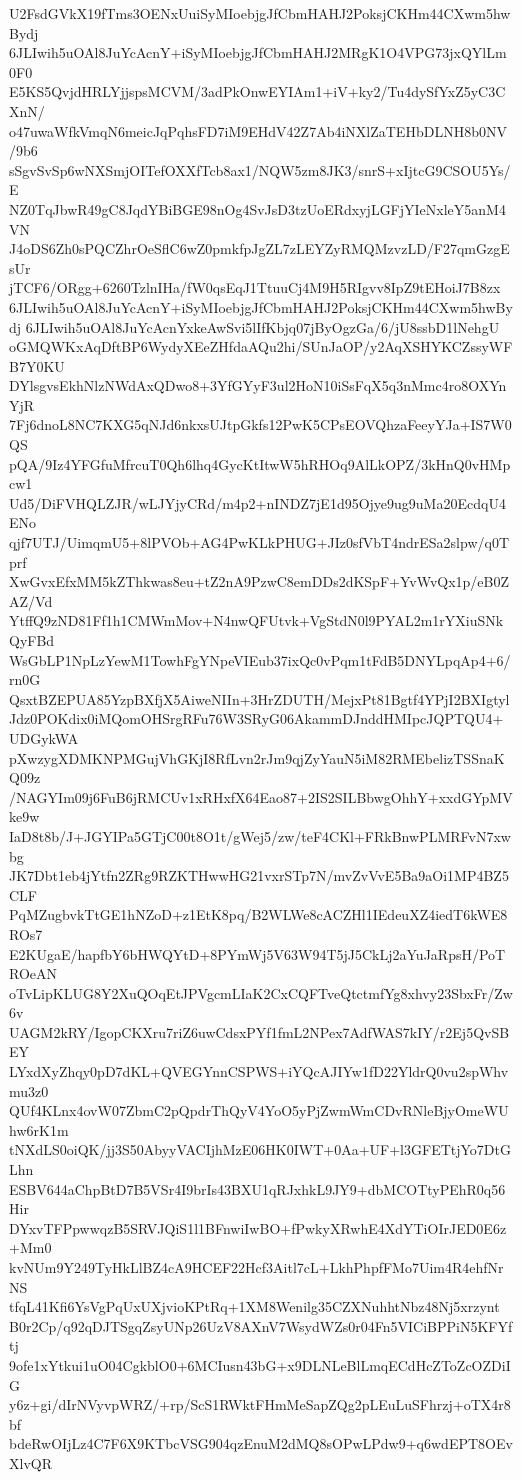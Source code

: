 U2FsdGVkX19fTms3OENxUuiSyMIoebjgJfCbmHAHJ2PoksjCKHm44CXwm5hwBydj
6JLIwih5uOAl8JuYcAcnY+iSyMIoebjgJfCbmHAHJ2MRgK1O4VPG73jxQYlLm0F0
E5KS5QvjdHRLYjjspsMCVM/3adPkOnwEYIAm1+iV+ky2/Tu4dySfYxZ5yC3CXnN/
o47uwaWfkVmqN6meicJqPqhsFD7iM9EHdV42Z7Ab4iNXlZaTEHbDLNH8b0NV/9b6
sSgvSvSp6wNXSmjOITefOXXfTcb8ax1/NQW5zm8JK3/snrS+xIjtcG9CSOU5Ys/E
NZ0TqJbwR49gC8JqdYBiBGE98nOg4SvJsD3tzUoERdxyjLGFjYIeNxleY5anM4VN
J4oDS6Zh0sPQCZhrOeSflC6wZ0pmkfpJgZL7zLEYZyRMQMzvzLD/F27qmGzgEsUr
jTCF6/ORgg+6260TzlnIHa/fW0qsEqJ1TtuuCj4M9H5RIgvv8IpZ9tEHoiJ7B8zx
6JLIwih5uOAl8JuYcAcnY+iSyMIoebjgJfCbmHAHJ2PoksjCKHm44CXwm5hwBydj
6JLIwih5uOAl8JuYcAcnYxkeAwSvi5lIfKbjq07jByOgzGa/6/jU8ssbD1lNehgU
oGMQWKxAqDftBP6WydyXEeZHfdaAQu2hi/SUnJaOP/y2AqXSHYKCZssyWFB7Y0KU
DYlsgvsEkhNlzNWdAxQDwo8+3YfGYyF3ul2HoN10iSsFqX5q3nMmc4ro8OXYnYjR
7Fj6dnoL8NC7KXG5qNJd6nkxsUJtpGkfs12PwK5CPsEOVQhzaFeeyYJa+IS7W0QS
pQA/9Iz4YFGfuMfrcuT0Qh6lhq4GycKtItwW5hRHOq9AlLkOPZ/3kHnQ0vHMpcw1
Ud5/DiFVHQLZJR/wLJYjyCRd/m4p2+nINDZ7jE1d95Ojye9ug9uMa20EcdqU4ENo
qjf7UTJ/UimqmU5+8lPVOb+AG4PwKLkPHUG+JIz0sfVbT4ndrESa2slpw/q0Tprf
XwGvxEfxMM5kZThkwas8eu+tZ2nA9PzwC8emDDs2dKSpF+YvWvQx1p/eB0ZAZ/Vd
YtffQ9zND81Ff1h1CMWmMov+N4nwQFUtvk+VgStdN0l9PYAL2m1rYXiuSNkQyFBd
WsGbLP1NpLzYewM1TowhFgYNpeVIEub37ixQc0vPqm1tFdB5DNYLpqAp4+6/rn0G
QsxtBZEPUA85YzpBXfjX5AiweNIIn+3HrZDUTH/MejxPt81Bgtf4YPjI2BXIgtyl
Jdz0POKdix0iMQomOHSrgRFu76W3SRyG06AkammDJnddHMIpcJQPTQU4+UDGykWA
pXwzygXDMKNPMGujVhGKjI8RfLvn2rJm9qjZyYauN5iM82RMEbelizTSSnaKQ09z
/NAGYIm09j6FuB6jRMCUv1xRHxfX64Eao87+2IS2SILBbwgOhhY+xxdGYpMVke9w
IaD8t8b/J+JGYIPa5GTjC00t8O1t/gWej5/zw/teF4CKl+FRkBnwPLMRFvN7xwbg
JK7Dbt1eb4jYtfn2ZRg9RZKTHwwHG21vxrSTp7N/mvZvVvE5Ba9aOi1MP4BZ5CLF
PqMZugbvkTtGE1hNZoD+z1EtK8pq/B2WLWe8cACZHl1IEdeuXZ4iedT6kWE8ROs7
E2KUgaE/hapfbY6bHWQYtD+8PYmWj5V63W94T5jJ5CkLj2aYuJaRpsH/PoTROeAN
oTvLipKLUG8Y2XuQOqEtJPVgcmLIaK2CxCQFTveQtctmfYg8xhvy23SbxFr/Zw6v
UAGM2kRY/IgopCKXru7riZ6uwCdsxPYf1fmL2NPex7AdfWAS7kIY/r2Ej5QvSBEY
LYxdXyZhqy0pD7dKL+QVEGYnnCSPWS+iYQcAJIYw1fD22YldrQ0vu2spWhvmu3z0
QUf4KLnx4ovW07ZbmC2pQpdrThQyV4YoO5yPjZwmWmCDvRNleBjyOmeWUhw6rK1m
tNXdLS0oiQK/jj3S50AbyyVACIjhMzE06HK0IWT+0Aa+UF+l3GFETtjYo7DtGLhn
ESBV644aChpBtD7B5VSr4I9brIs43BXU1qRJxhkL9JY9+dbMCOTtyPEhR0q56Hir
DYxvTFPpwwqzB5SRVJQiS1l1BFnwiIwBO+fPwkyXRwhE4XdYTiOIrJED0E6z+Mm0
kvNUm9Y249TyHkLlBZ4cA9HCEF22Hcf3Aitl7cL+LkhPhpfFMo7Uim4R4ehfNrNS
tfqL41Kfi6YsVgPqUxUXjvioKPtRq+1XM8Wenilg35CZXNuhhtNbz48Nj5xrzynt
B0r2Cp/q92qDJTSgqZsyUNp26UzV8AXnV7WsydWZs0r04Fn5VICiBPPiN5KFYftj
9ofe1xYtkui1uO04CgkblO0+6MCIusn43bG+x9DLNLeBlLmqECdHcZToZcOZDiIG
y6z+gi/dIrNVyvpWRZ/+rp/ScS1RWktFHmMeSapZQg2pLEuLuSFhrzj+oTX4r8bf
bdeRwOIjLz4C7F6X9KTbcVSG904qzEnuM2dMQ8sOPwLPdw9+q6wdEPT8OEvXlvQR
